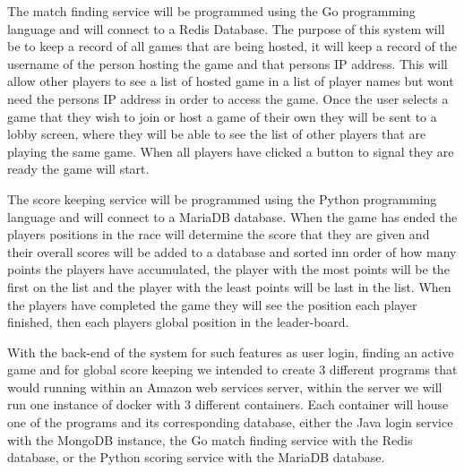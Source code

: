 The match finding service will be programmed using the Go programming language and will connect to a Redis Database. The purpose of this system will be to keep a record of all games that are being hosted, it will keep a record of the username of the person hosting the game and that persons IP address. This will allow other players to see a list of hosted game in a list of player names but wont need the persons IP address in order to access the game. Once the user selects a game that they wish to join or host a game of their own they will be sent to a lobby screen, where they will be able to see the list of other players that are playing the same game. When all players have clicked a button to signal they are ready the game will start.\newline 

The score keeping service will be programmed using the Python programming language and will connect to a MariaDB database. When the game has ended the players positions in the race will determine the score that they are given and their overall scores will be added to a database and sorted inn order of how many points the players have accumulated, the player with the most points will be the first on the list and the player with the least points will be last in the list. When the players have completed the game they will see the position each player finished, then each players global position in the leader-board.\newline

With the back-end of the system for such features as user login, finding an active game and for global score keeping we intended to create 3 different programs that would running within an Amazon web services server, within the server we will run one instance of docker with 3 different containers. Each container will house one of the programs and its corresponding database, either the Java login service with the MongoDB instance, the Go match finding service with the Redis database, or the Python scoring service with the MariaDB database. \newline \newline

